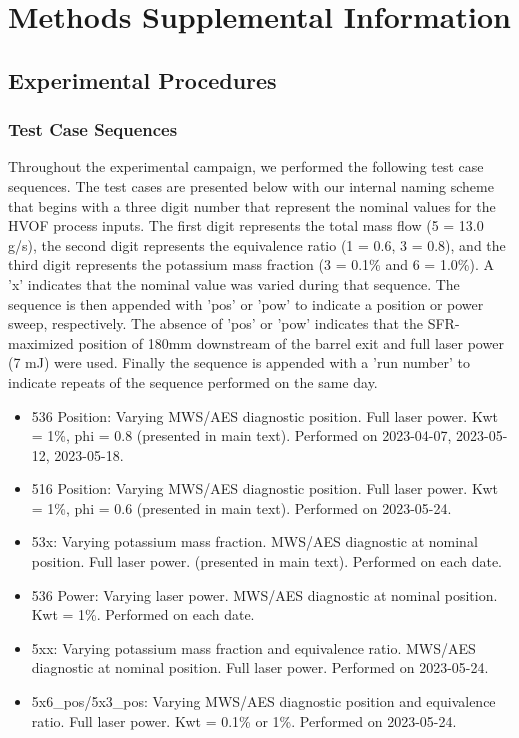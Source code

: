 \section{Methods Supplemental Information}


\subsection{Experimental Procedures}

\subsubsection{Test Case Sequences}


Throughout the experimental campaign, we performed the following test case sequences. The test cases are presented below with our internal naming scheme that begins with a three digit number that represent the nominal values for the HVOF process inputs. The first digit represents the total mass flow (5 = 13.0 g/s), the second digit represents the equivalence ratio (1 = 0.6, 3 = 0.8), and the third digit represents the potassium mass fraction (3 = 0.1\% and 6 = 1.0\%). A 'x' indicates that the nominal value was varied during that sequence. The sequence is then appended with 'pos' or 'pow' to indicate a position or power sweep, respectively. The absence of 'pos' or 'pow' indicates that the SFR-maximized position of 180mm downstream of the barrel exit and full laser power (7 mJ) were used. Finally the sequence is appended with a 'run number' to indicate repeats of the sequence performed on the same day. 


\begin{itemize}
    \item 536 Position: Varying MWS/AES diagnostic position. Full laser power. Kwt = 1\%, phi = 0.8 (presented in main text). Performed on 2023-04-07, 2023-05-12, 2023-05-18.
    \item 516 Position: Varying MWS/AES diagnostic position. Full laser power. Kwt = 1\%, phi = 0.6 (presented in main text). Performed on 2023-05-24.
    \item 53x: Varying potassium mass fraction. MWS/AES diagnostic at nominal position. Full laser power. (presented in main text). Performed on each date. 
    \item 536 Power: Varying laser power. MWS/AES diagnostic at nominal position. Kwt = 1\%. Performed on each date. 
    \item 5xx: Varying potassium mass fraction and equivalence ratio. MWS/AES diagnostic at nominal position. Full laser power. Performed on 2023-05-24.
    \item 5x6\_pos/5x3\_pos: Varying MWS/AES diagnostic position and equivalence ratio. Full laser power. Kwt = 0.1\% or 1\%. Performed on 2023-05-24.
\end{itemize}

